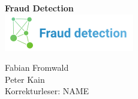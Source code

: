 \documentclass[a4page]{article}
\begin{document}
\thispagestyle{empty}
\begin{center}
{\Huge \textbf{Fraud Detection}}
\noindent\makebox[\linewidth]{\rule{\paperwidth}{0.4pt}}
\\[156pt]
\includegraphics[scale=9.0]{images/p184c02.png}
\\[300pt]
\end{center}

\begin{Large}
\begin{flushleft}
Fabian Fromwald\\
Peter Kain\\
Korrekturleser: NAME
\end{flushleft}
\end{Large}
\end{document}
